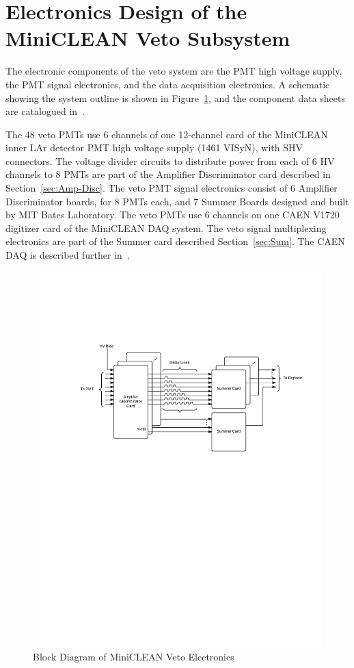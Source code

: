 \documentclass{JINST}
\begin{document}
\section{Electronics Design of the MiniCLEAN Veto Subsystem}
\label{sec:electronics_design}
%
The electronic components of the veto system are the PMT high voltage supply, the PMT signal electronics, and the data acquisition electronics.  A schematic showing the system outline is shown in Figure~\ref{fig:block_diagram}, and the component data sheets are catalogued in~\cite{ref:vetocomponentdatasheets}.

The 48 veto PMTs use 6 channels of one 12-channel card of the
MiniCLEAN inner LAr detector PMT high voltage supply (1461 VISyN),
with SHV connectors.  The voltage divider circuits to distribute power
from each of 6 HV channels to 8 PMTs are part of the Amplifier
Discriminator card described in Section~\ref{sec:Amp-Disc}.  The veto
PMT signal electronics consist of 6 Amplifier Discriminator boards,
for 8 PMTs each, and 7 Summer Boards designed and built by MIT Bates
Laboratory.  The veto PMTs use 6 channels on one CAEN V1720 digitizer
card of the MiniCLEAN DAQ system.  The veto signal multiplexing
electronics are part of the Summer card described
Section~\ref{sec:Sum}.  The CAEN DAQ is described further
in~\cite{ref:gastler_thesis}.

\begin{figure}[ht]
\begin{center}
\includegraphics[width=5in, keepaspectratio=true, trim=1.25in 5.75in 0.5in 2in, clip=true]{graphics/block}
\caption{Block Diagram of MiniCLEAN Veto Electronics}
\label{fig:block_diagram}
\end{center}
\end{figure}
\end{document}
